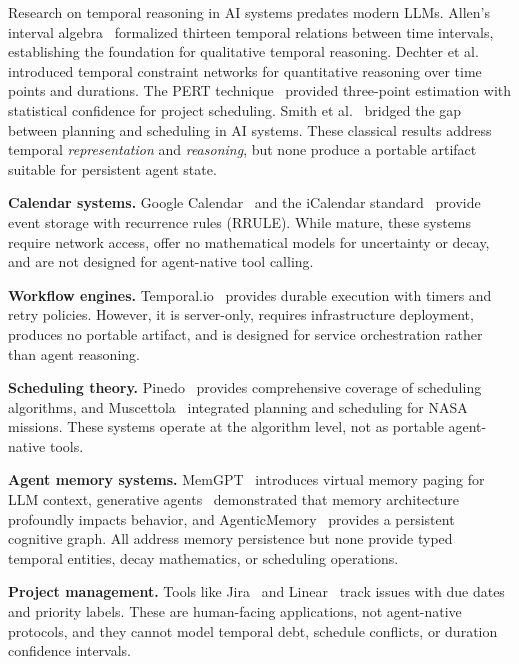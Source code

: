 \documentclass[10pt, twocolumn]{article}
\begin{document}
Research on temporal reasoning in AI systems predates modern LLMs. Allen's interval algebra~\cite{allen1983temporal} formalized thirteen temporal relations between time intervals, establishing the foundation for qualitative temporal reasoning. Dechter et al.~\cite{dechter1991temporal} introduced temporal constraint networks for quantitative reasoning over time points and durations. The PERT technique~\cite{pert1959} provided three-point estimation with statistical confidence for project scheduling. Smith et al.~\cite{smith2000reactive} bridged the gap between planning and scheduling in AI systems. These classical results address temporal \emph{representation} and \emph{reasoning}, but none produce a portable artifact suitable for persistent agent state.

\textbf{Calendar systems.} Google Calendar~\cite{google_calendar_api} and the iCalendar standard~\cite{ical_rfc5545} provide event storage with recurrence rules (RRULE). While mature, these systems require network access, offer no mathematical models for uncertainty or decay, and are not designed for agent-native tool calling.

\textbf{Workflow engines.} Temporal.io~\cite{temporal_io_2024} provides durable execution with timers and retry policies. However, it is server-only, requires infrastructure deployment, produces no portable artifact, and is designed for service orchestration rather than agent reasoning.

\textbf{Scheduling theory.} Pinedo~\cite{pinedo2016scheduling} provides comprehensive coverage of scheduling algorithms, and Muscettola~\cite{muscettola1998hsts} integrated planning and scheduling for NASA missions. These systems operate at the algorithm level, not as portable agent-native tools.

\textbf{Agent memory systems.} MemGPT~\cite{packer2023memgpt} introduces virtual memory paging for LLM context, generative agents~\cite{park2023generative} demonstrated that memory architecture profoundly impacts behavior, and AgenticMemory~\cite{owolabi2026agenticmemory} provides a persistent cognitive graph. All address memory persistence but none provide typed temporal entities, decay mathematics, or scheduling operations.

\textbf{Project management.} Tools like Jira~\cite{jira_2024} and Linear~\cite{linear_2024} track issues with due dates and priority labels. These are human-facing applications, not agent-native protocols, and they cannot model temporal debt, schedule conflicts, or duration confidence intervals.
\end{document}
